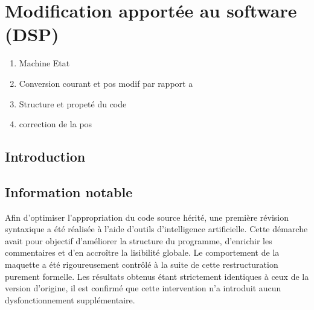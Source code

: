 \chapter{Modification apportée au software (DSP)}

\begin{enumerate}
    \item Machine Etat
    \item Conversion courant et pos modif par rapport a
    \item Structure et propeté du code
    \item correction de la pos
\end{enumerate}

\section{Introduction}

\section{Information notable}
Afin d'optimiser l'appropriation du code source hérité, une première révision syntaxique a été réalisée à l'aide d'outils d'intelligence artificielle. Cette démarche avait pour objectif d'améliorer la structure du programme, d'enrichir les commentaires et d'en accroître la lisibilité globale. Le comportement de la maquette a été rigoureusement contrôlé à la suite de cette restructuration purement formelle. Les résultats obtenus étant strictement identiques à ceux de la version d'origine, il est confirmé que cette intervention n'a introduit aucun dysfonctionnement supplémentaire.